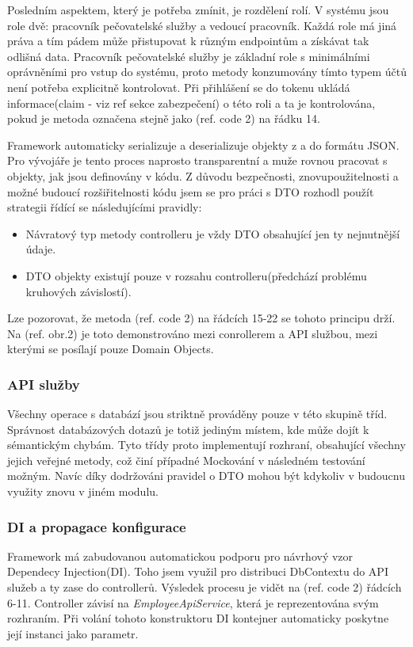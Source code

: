 \documentclass[
  biblatex,
  glossaries,
  index
]{kidiplom}
\begin{document}
Posledním aspektem, který je potřeba zmínit, je rozdělení rolí. V systému jsou role dvě: pracovník pečovatelské služby a vedoucí pracovník. Každá role má jiná práva a tím pádem může přistupovat k různým endpointům a získávat tak odlišná data. Pracovník pečovatelské služby je základní role s minimálními oprávněními pro vstup do systému, proto metody konzumovány tímto typem účtů není potřeba explicitně kontrolovat. Při přihlášení se do tokenu ukládá informace(claim - viz ref sekce zabezpečení) o této roli a ta je kontrolována, pokud je metoda označena stejně jako (ref. code 2) na řádku 14.

Framework automaticky serializuje a deserializuje objekty z a do formátu JSON. Pro vývojáře je tento proces naprosto transparentní a muže rovnou pracovat s objekty, jak jsou definovány v kódu. Z důvodu bezpečnosti, znovupoužitelnosti a možné budoucí rozšiřitelnosti kódu jsem se pro práci s DTO rozhodl použít strategii řídící se následujícími pravidly: 
\begin{itemize}
	\item Návratový typ metody controlleru je vždy DTO obsahující jen ty nejnutnější údaje.
	\item DTO objekty existují pouze v rozsahu controlleru(předchází problému kruhových závislostí).
\end{itemize} 
Lze pozorovat, že metoda (ref. code 2) na řádcích 15-22 se tohoto principu drží. Na (ref. obr.2) je toto demonstrováno mezi conrollerem a API službou, mezi kterými se posílají pouze Domain Objects.

\subsubsection{API služby}
Všechny operace s databází jsou striktně prováděny pouze v této skupině tříd. Správnost databázových dotazů je totiž jediným místem, kde může dojít k sémantickým chybám. Tyto třídy proto implementují rozhraní, obsahující všechny jejich veřejné metody, což činí případné Mockování v následném testování možným. Navíc díky dodržováni pravidel o DTO mohou být kdykoliv v budoucnu využity znovu v jiném modulu. 

\subsubsection{DI a propagace konfigurace}
Framework má zabudovanou automatickou podporu pro návrhový vzor Dependecy Injection(DI). Toho jsem využil pro distribuci DbContextu do API služeb a ty zase do controllerů. Výsledek procesu je vidět na (ref. code 2) řádcích 6-11. Controller závisí na \textit{EmployeeApiService}, která je reprezentována svým rozhraním.  Při volání tohoto konstruktoru DI kontejner automaticky poskytne její instanci jako parametr.
\end{document}
